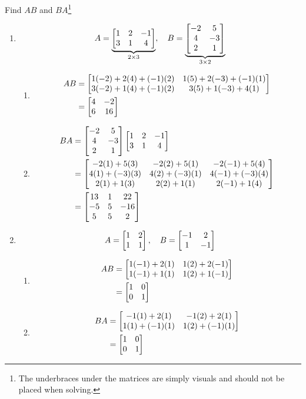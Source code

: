 \begin{example}
Find $AB$ and $BA$\footnote{The underbraces under the matrices are simply visuals and should not be placed when solving.}
\begin{enumerate}
    \item $$A = \underbrace{\begin{bmatrix} 1 & 2 & -1 \\ 3 & 1 & 4 \end{bmatrix}}_{2 \times 3}, \quad B = \underbrace{\begin{bmatrix} -2 & 5 \\ 4 & -3 \\ 2 & 1 \end{bmatrix}}_{3 \times 2}$$
    \begin{enumerate}
        \item \begin{align*}
            AB &= \begin{bmatrix} 1(-2) + 2(4) + (-1)(2) & 1(5) + 2(-3) + (-1)(1) \\ 3(-2) + 1(4) + (-1)(2) & 3(5) + 1(-3) + 4(1) \end{bmatrix} \\
            &= \begin{bmatrix} 4 & -2 \\ 6 & 16 \end{bmatrix}
        \end{align*}

        \item \begin{align*}
            BA &= \begin{bmatrix} -2 & 5 \\ 4 & -3 \\ 2 & 1 \end{bmatrix} \begin{bmatrix} 1 & 2 & -1 \\ 3 & 1 & 4 \end{bmatrix} \\
            &= \begin{bmatrix} -2(1) + 5(3) & -2(2) + 5(1) & -2(-1) + 5(4) \\ 4(1) + (-3)(3) & 4(2) + (-3)(1) & 4(-1) + (-3)(4) \\ 2(1) + 1(3) & 2(2) + 1(1) & 2(-1) + 1(4) \end{bmatrix} \\
            & = \begin{bmatrix} 13 & 1 & 22 \\ -5 & 5 & -16 \\ 5 & 5 & 2 \end{bmatrix}
        \end{align*}
    \end{enumerate}

    \item $$A = \begin{bmatrix} 1 & 2 \\ 1 & 1 \end{bmatrix}, \quad B = \begin{bmatrix} -1 & 2 \\ 1 & -1 \end{bmatrix}$$
    \begin{enumerate}
        \item \begin{align*}
            AB &= \begin{bmatrix} 1(-1) + 2(1) & 1(2) + 2(-1) \\ 1(-1) + 1(1) & 1(2) + 1(-1) \end{bmatrix} \\
            &=\begin{bmatrix} 1 & 0 \\ 0 & 1 \end{bmatrix}
        \end{align*}
        \item \begin{align*}
            BA &= \begin{bmatrix} -1(1) + 2(1) & -1(2) + 2(1) \\ 1(1) + (-1)(1) & 1(2) + (-1)(1) \end{bmatrix} \\
            &= \begin{bmatrix} 1 & 0 \\ 0 & 1 \end{bmatrix}
        \end{align*}
    \end{enumerate}
\end{enumerate}
\end{example}

